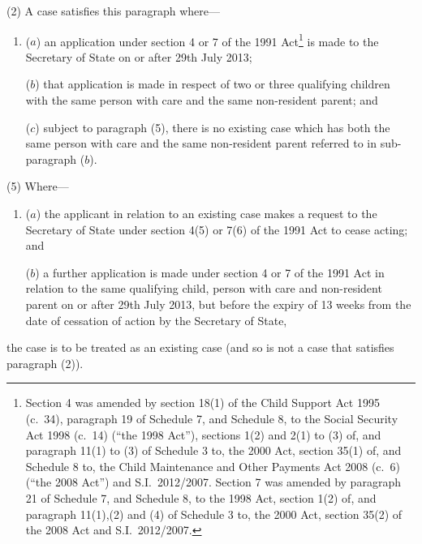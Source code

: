 \documentclass[12pt,a4paper]{article}
\begin{document}
(2) A case satisfies this paragraph where—
\begin{enumerate}\item[]
($a$) an application under section 4 or 7 of the 1991 Act\footnote{Section 4 was amended by section 18(1) of the Child Support Act 1995 (c.~34), paragraph 19 of Schedule 7, and Schedule 8, to the Social Security Act 1998 (c.~14) (“the 1998 Act”), sections 1(2) and 2(1) to (3) of, and paragraph 11(1) to (3) of Schedule 3 to, the 2000 Act, section 35(1) of, and Schedule 8 to, the Child Maintenance and Other Payments Act 2008 (c.~6) (“the 2008 Act”) and S.I.~2012/2007. Section 7 was amended by paragraph 21 of Schedule 7, and Schedule 8, to the 1998 Act, section 1(2) of, and paragraph 11(1),(2) and (4) of Schedule 3 to, the 2000 Act, section 35(2) of the 2008 Act and S.I.~2012/2007.} is made to the Secretary of State on or after 29th July 2013;

($b$) that application is made in respect of two or three qualifying children with the same person with care and the same non-resident parent; and

($c$) subject to paragraph (5), there is no existing case which has both the same person with care and the same non-resident parent referred to in sub-paragraph ($b$).
\end{enumerate}

%
%
%

(5) Where—
\begin{enumerate}\item[]
($a$) the applicant in relation to an existing case makes a request to the Secretary of State under section 4(5) or 7(6) of the 1991 Act to cease acting; and

($b$) a further application is made under section 4 or 7 of the 1991 Act in relation to the same qualifying child, person with care and non-resident parent on or after 29th July 2013, but before the expiry of 13 weeks from the date of cessation of action by the Secretary of State,
\end{enumerate}
the case is to be treated as an existing case (and so is not a case that satisfies paragraph (2)).
\end{document}
